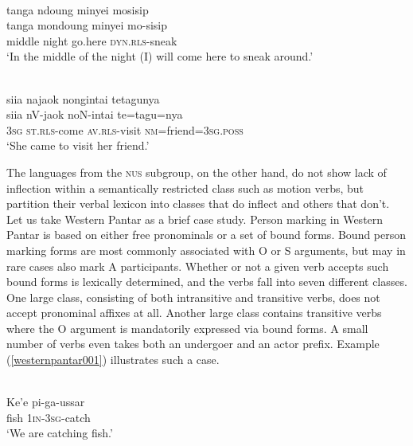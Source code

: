 \ea \label{tajio001}
\\
\glll tanga ndoung minyei mosisip \\
tanga mondoung minyei mo-sisip \\
middle night go.here \textsc{dyn}.\textsc{rls}-sneak \\
\glft `In the middle of the night (I) will come here to sneak around.’\\ 
\z

\ea \label{tajio002}
\\
\glll siia najaok nongintai tetagunya \\
siia nV-jaok noN-intai te=tagu=nya \\
\textsc{3}\textsc{sg} \textsc{st}.\textsc{rls}-come \textsc{av}.\textsc{rls}-visit \textsc{nm}=friend=\textsc{3}\textsc{sg}.\textsc{poss} \\
\glft `She came to visit her friend.’\\ 
\z

The languages from the \textsc{nus} subgroup, on the other hand, do not show lack of inflection within a semantically restricted class such as motion verbs, but partition their verbal lexicon into classes that do inflect and others that don't. Let us take Western Pantar \citep{holton2010person, holton2014western} as a brief case study. Person marking in Western Pantar is based on either free pronominals or a set of bound forms. Bound person marking forms are most commonly associated with O or S arguments, but may in rare cases also mark A participants. Whether or not a given verb accepts such bound forms is lexically determined, and the verbs fall into seven different classes. One large class, consisting of both intransitive and transitive verbs, does not accept pronominal affixes at all. Another large class contains transitive verbs where the O argument is mandatorily expressed via bound forms. A small number of verbs even takes both an undergoer and an actor prefix. Example (\ref{westernpantar001}) illustrates such a case.

\ea \label{westernpantar001}
\\
\gll Ke'e pi-ga-ussar \\
fish 1\textsc{in}-3\textsc{sg}-catch \\
\glft `We are catching fish.'\\ 
\z

